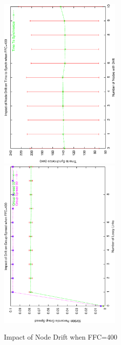 \begin{figure}
\centerline{%
\includegraphics[width=6cm,angle=270]{figures/TTSvsDriftFFC400.ps}
\includegraphics[width=6cm,angle=270]{figures/GSvsDriftFFC400.ps}
}
\caption{Impact of Node Drift when FFC=400}
\label{fig:drift400}
\end{figure}

